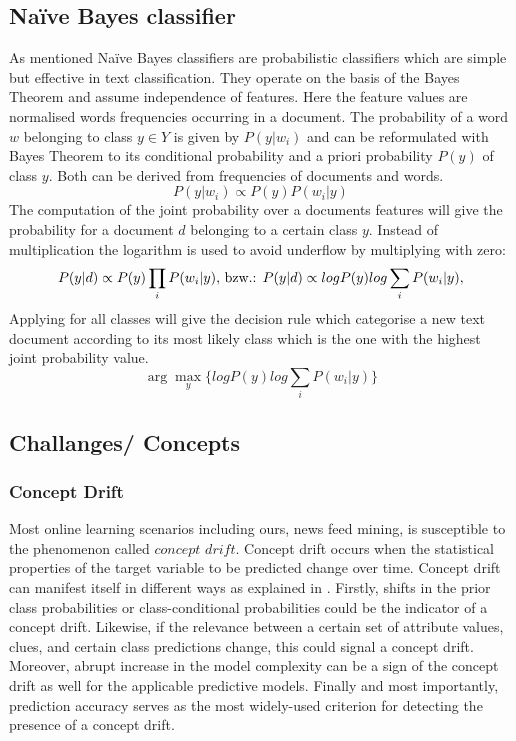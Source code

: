 \documentclass{article} %
\begin{document}
\subsection{Na\"ive Bayes classifier}
As mentioned Na\"ive Bayes classifiers are probabilistic classifiers which are simple but effective in text classification. They operate on the basis of the Bayes Theorem and assume independence of features. Here the feature values are normalised  words frequencies occurring in a document. The probability of a word $w$ belonging to class $y \in Y$ is given by $P(y|w_i)$ and can be reformulated with Bayes Theorem to its conditional probability and a priori probability $ P(y)$ of class $y$. Both can be derived from frequencies of documents and words.
$$
P(y|w_i) \propto P(y)P(w_i|y)
$$
The computation of the joint probability over a documents features will give the probability for a  document $d$ belonging to a certain class $y$. Instead of multiplication the logarithm is used to avoid underflow by multiplying with zero:
$$
P(y|d) \propto P(y)\prod_i P(w_i|y)\space
\textrm{,  bzw.:    }
P(y|d) \propto log P(y) log \sum_i P(w_i|y),
$$
Applying for all classes will give the decision rule which categorise a new text document according to its most likely class which is the one with the highest joint probability value.
$$
\arg\max_y\{ log P(y) log \sum_i P(w_i|y)\}
$$

\subsection{Challanges/ Concepts}

\subsubsection{Concept Drift}
Most online learning scenarios including ours, news feed mining, is susceptible to the phenomenon called $concept$ $drift$. Concept drift occurs when the statistical properties of the target variable to be predicted change over time. Concept drift can manifest itself in different ways as explained in \cite[p. 5]{KunchevaEnsembleOverview08} . Firstly, shifts in the prior class probabilities or class-conditional probabilities could be the indicator of a concept drift. Likewise, if the relevance between a certain set of attribute values, clues, and certain class predictions change, this could signal a concept drift. Moreover, abrupt increase in the model complexity can be a sign of the concept drift as well for the applicable predictive models. Finally and most importantly, prediction accuracy serves as the most widely-used criterion for detecting the presence of a concept drift. 
\end{document}
